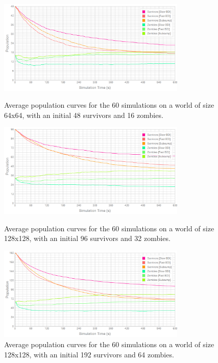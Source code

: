 \documentclass[12pt,a4paper]{article}
\begin{document}
\begin{figure}
\vspace{-20mm}
\centering
\includegraphics[width=0.8\textwidth]{../../Results/64_48_16/population}
\caption{\small Average population curves for the 60 simulations on a world of size 64x64, with an initial 48 survivors and 16 zombies.}
\label{fig:64_48_16_pop}

\vspace{5mm}
\includegraphics[width=0.8\textwidth]{../../Results/128_96_32/population}
\caption{\small Average population curves for the 60 simulations on a world of size 128x128, with an initial 96 survivors and 32 zombies.}
\label{fig:64_96_32_pop}

\vspace{5mm}
\includegraphics[width=0.8\textwidth]{../../Results/128_192_64/population}
\caption{\small Average population curves for the 60 simulations on a world of size 128x128, with an initial 192 survivors and 64 zombies.}
\label{fig:128_192_64_pop}
\end{figure}
\end{document}
